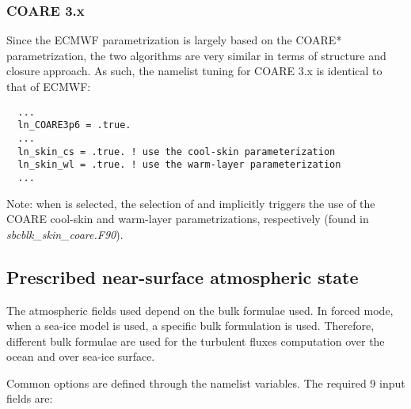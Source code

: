 \documentclass[../main/NEMO_manual]{subfiles}
\begin{document}
\subsubsection{COARE 3.x}
%
Since the ECMWF parametrization is largely based on the COARE* parametrization,
the two algorithms are very similar in terms of structure and closure
approach. As such, the namelist tuning for COARE 3.x is identical to that of
ECMWF:
%
\begin{verbatim}
  ...
  ln_COARE3p6 = .true.
  ...     
  ln_skin_cs = .true. ! use the cool-skin parameterization
  ln_skin_wl = .true. ! use the warm-layer parameterization
  ...
\end{verbatim}

Note: when  is selected, the selection
of  and  implicitly
triggers the use of the COARE cool-skin and warm-layer parametrizations,
respectively (found in \textit{sbcblk\_skin\_coare.F90}).








\subsection{Prescribed near-surface atmospheric state}

The atmospheric fields used depend on the bulk formulae used.  In forced mode,
when a sea-ice model is used, a specific bulk formulation is used.  Therefore,
different bulk formulae are used for the turbulent fluxes computation over the
ocean and over sea-ice surface.
%


Common options are defined through the  namelist variables.
The required 9 input fields are:
\end{document}
